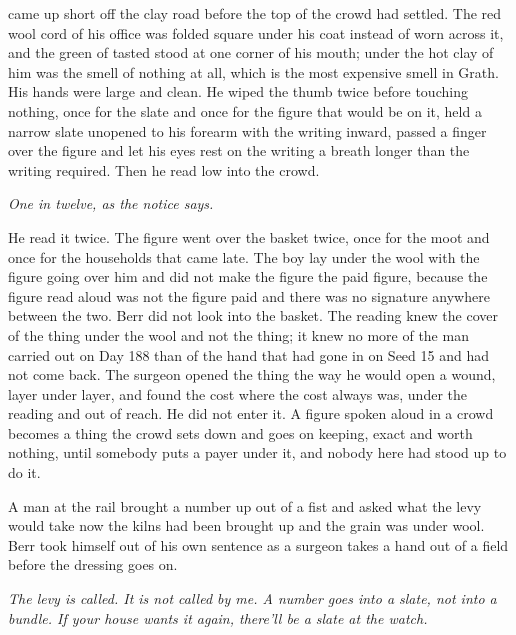  came up short off the clay road before the top of the crowd had settled. The red wool cord of his office was folded square under his coat instead of worn across it, and the green of tasted  stood at one corner of his mouth; under the hot clay of him was the smell of nothing at all, which is the most expensive smell in Grath. His hands were large and clean. He wiped the thumb twice before touching nothing, once for the slate and once for the figure that would be on it, held a narrow slate unopened to his forearm with the writing inward, passed a finger over the figure and let his eyes rest on the writing a breath longer than the writing required. Then he read low into the crowd.

\emph{One in twelve, as the notice says.}

He read it twice. The figure went over the basket twice, once for the moot and once for the households that came late. The boy lay under the wool with the figure going over him and did not make the figure the paid figure, because the figure read aloud was not the figure paid and there was no signature anywhere between the two. Berr did not look into the basket. The reading knew the cover of the thing under the wool and not the thing; it knew no more of the man carried out on Day 188 than of the hand that had gone in on Seed 15 and had not come back. The surgeon opened the thing the way he would open a wound, layer under layer, and found the cost where the cost always was, under the reading and out of reach. He did not enter it. A figure spoken aloud in a crowd becomes a thing the crowd sets down and goes on keeping, exact and worth nothing, until somebody puts a payer under it, and nobody here had stood up to do it.

A man at the rail brought a number up out of a fist and asked what the levy would take now the kilns had been brought up and the grain was under wool. Berr took himself out of his own sentence as a surgeon takes a hand out of a field before the dressing goes on.

\emph{The levy is called. It is not called by me. A number goes into a slate, not into a bundle. If your house wants it again, there'll be a slate at the watch.}

